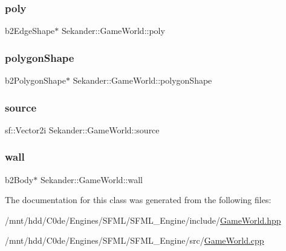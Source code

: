 \subsubsection{\texorpdfstring{poly}{poly}}
{\footnotesize\ttfamily b2\+Edge\+Shape$\ast$ Sekander\+::\+Game\+World\+::poly\hspace{0.3cm}{\ttfamily [private]}}

\mbox{\label{classSekander_1_1GameWorld_a0797c51490bfc5a53b8effac8f195a65}} 
\subsubsection{\texorpdfstring{polygon\+Shape}{polygonShape}}
{\footnotesize\ttfamily b2\+Polygon\+Shape$\ast$ Sekander\+::\+Game\+World\+::polygon\+Shape\hspace{0.3cm}{\ttfamily [private]}}

\mbox{\label{classSekander_1_1GameWorld_a2a23ea4e9dce3bdeee4ce38e2a8a7122}} 
\subsubsection{\texorpdfstring{source}{source}}
{\footnotesize\ttfamily sf\+::\+Vector2i Sekander\+::\+Game\+World\+::source\hspace{0.3cm}{\ttfamily [private]}}

\mbox{\label{classSekander_1_1GameWorld_a0a67f9a7d37aa2aaa03e1a66a46119e8}} 
\subsubsection{\texorpdfstring{wall}{wall}}
{\footnotesize\ttfamily b2\+Body$\ast$ Sekander\+::\+Game\+World\+::wall\hspace{0.3cm}{\ttfamily [private]}}



The documentation for this class was generated from the following files\+:\begin{DoxyCompactItemize}
\item 
/mnt/hdd/\+C0de/\+Engines/\+S\+F\+M\+L/\+S\+F\+M\+L\+\_\+\+Engine/include/\hyperlink{GameWorld_8hpp}{Game\+World.\+hpp}\item 
/mnt/hdd/\+C0de/\+Engines/\+S\+F\+M\+L/\+S\+F\+M\+L\+\_\+\+Engine/src/\hyperlink{GameWorld_8cpp}{Game\+World.\+cpp}\end{DoxyCompactItemize}
